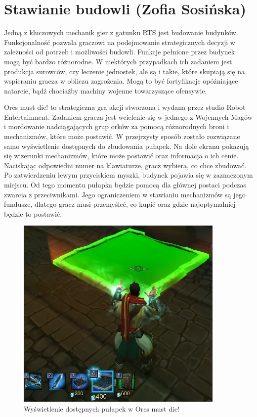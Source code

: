 \section{Stawianie budowli (Zofia Sosińska)}\label{chap:omd}
Jedną z kluczowych mechanik gier z gatunku RTS jest budowanie budynków. Funkcjonalność pozwala graczowi 
na podejmowanie strategicznych decyzji w zależności od potrzeb i możliwości budowli. Funkcje pełnione 
przez budynek mogą być bardzo różnorodne. W niektórych przypadkach ich zadaniem jest produkcja surowców, czy leczenie
jednostek, ale są i takie, które skupiają się na wspieraniu gracza w obliczu zagrożenia. Mogą to być fortyfikacje opóźniające natarcie,
bądź chociażby machiny wojenne towarzyszące ofensywie.

Orcs must die! to strategiczna gra akcji stworzona i wydana przez studio Robot Entertainment. Zadaniem gracza jest wcielenie się
w jednego z Wojennych Magów i mordowanie nadciągających grup orków za pomocą różnorodnych broni i mechanizmów, które może postawić.
W przejrzysty sposób zostało rozwiązane samo wyświetlenie dostępnych do zbudowania pułapek. Na dole ekranu pokazują się wizerunki mechanizmów,
które może postawić oraz informacja o ich cenie. Naciskając odpowiedni numer na klawiaturze, gracz wybiera, co chce zbudować. Po zatwierdzeniu lewym przyciskiem myszki,
budynek pojawia się w zaznaczonym miejscu. Od tego momentu pułapka będzie pomocą dla głównej postaci podczas zwarcia z przeciwnikami.
Jego ograniczeniem w stawianiu mechanizmów są jego fundusze, dlatego gracz musi przemyśleć, co kupić oraz gdzie najoptymalniej będzie to postawić.

\begin{figure}[h!tbp]
    \centering
    \includegraphics[width=0.9\textwidth]{images/ui/buoildingsOrcs.png}
    \caption{Wyświetlenie dostępnych pułapek w Orcs must die!}\label{fig:Orcs}
\end{figure}